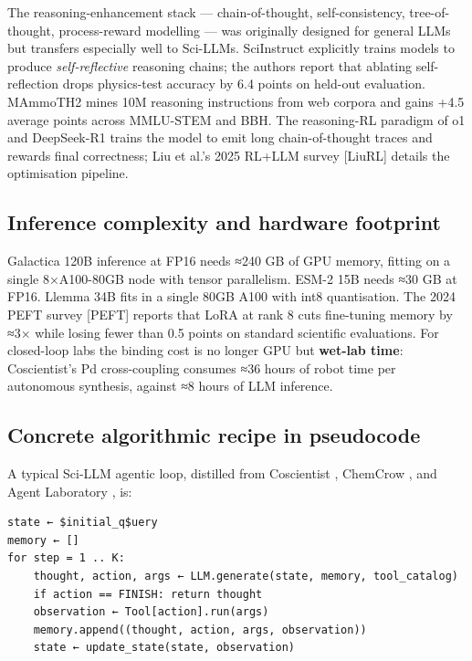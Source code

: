 \documentclass{article}
\begin{document}
The reasoning-enhancement stack --- chain-of-thought, self-consistency, tree-of-thought, process-reward modelling --- was originally designed for general LLMs but transfers especially well to Sci-LLMs. SciInstruct \cite{zhang2024sciinstructaselfre} explicitly trains models to produce \emph{self-reflective} reasoning chains; the authors report that ablating self-reflection drops physics-test accuracy by 6.4 points on held-out evaluation. MAmmoTH2 \cite{yue2024mammoth2scalingins} mines 10M reasoning instructions from web corpora and gains +4.5 average points across MMLU-STEM and BBH. The reasoning-RL paradigm of o1 and DeepSeek-R1 trains the model to emit long chain-of-thought traces and rewards final correctness; Liu et al.'s 2025 RL+LLM survey {[}LiuRL{]} details the optimisation pipeline.

\subsection{Inference complexity and hardware footprint}\label{inference-complexity-and-hardware-footprint}

Galactica 120B inference at FP16 needs ≈240 GB of GPU memory, fitting on a single 8×A100-80GB node with tensor parallelism. ESM-2 15B needs ≈30 GB at FP16. Llemma 34B fits in a single 80GB A100 with int8 quantisation. The 2024 PEFT survey {[}PEFT{]} reports that LoRA at rank 8 cuts fine-tuning memory by ≈3× while losing fewer than 0.5 points on standard scientific evaluations. For closed-loop labs the binding cost is no longer GPU but \textbf{wet-lab time}: Coscientist's Pd cross-coupling \cite{boiko2023nature6242023} consumes ≈36 hours of robot time per autonomous synthesis, against ≈8 hours of LLM inference.

\subsection{Concrete algorithmic recipe in pseudocode}\label{concrete-algorithmic-recipe-in-pseudocode}

A typical Sci-LLM agentic loop, distilled from Coscientist \cite{boiko2023nature6242023}, ChemCrow \cite{bran2024naturemachineintel}, and Agent Laboratory \cite{schmidgall2025agentlaboratoryusi}, is:

\begin{verbatim}
state ← $initial_q$uery
memory ← []
for step = 1 .. K:
    thought, action, args ← LLM.generate(state, memory, tool_catalog)
    if action == FINISH: return thought
    observation ← Tool[action].run(args)
    memory.append((thought, action, args, observation))
    state ← update_state(state, observation)
\end{verbatim}
\end{document}

